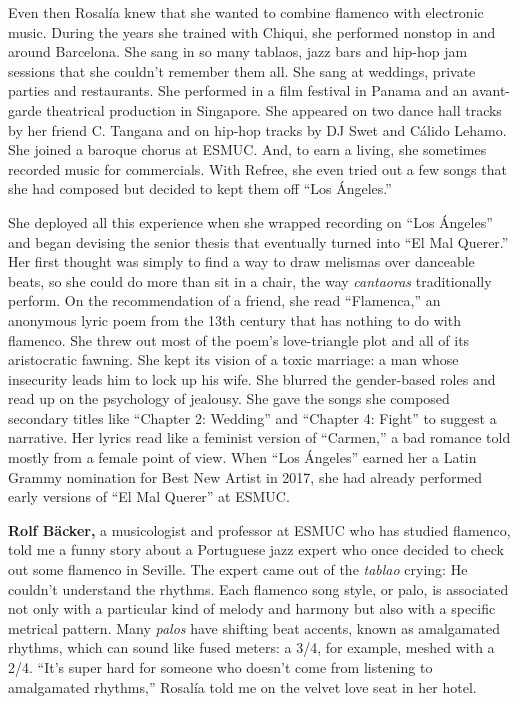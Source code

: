 Even then Rosalía knew that she wanted to combine flamenco with
electronic music. During the years she trained with Chiqui, she
performed nonstop in and around Barcelona. She sang in so many tablaos,
jazz bars and hip-hop jam sessions that she couldn't remember them all.
She sang at weddings, private parties and restaurants. She performed in
a film festival in Panama and an avant-garde theatrical production in
Singapore. She appeared on two dance hall tracks by her friend C.
Tangana and on hip-hop tracks by DJ Swet and Cálido Lehamo. She joined a
baroque chorus at ESMUC. And, to earn a living, she sometimes recorded
music for commercials. With Refree, she even tried out a few songs that
she had composed but decided to kept them off ``Los Ángeles.''

She deployed all this experience when she wrapped recording on ``Los
Ángeles'' and began devising the senior thesis that eventually turned
into ``El Mal Querer.'' Her first thought was simply to find a way to
draw melismas over danceable beats, so she could do more than sit in a
chair, the way \emph{cantaoras} traditionally perform. On the
recommendation of a friend, she read ``Flamenca,'' an anonymous lyric
poem from the 13th century that has nothing to do with flamenco. She
threw out most of the poem's love-triangle plot and all of its
aristocratic fawning. She kept its vision of a toxic marriage: a man
whose insecurity leads him to lock up his wife. She blurred the
gender-based roles and read up on the psychology of jealousy. She gave
the songs she composed secondary titles like ``Chapter 2: Wedding'' and
``Chapter 4: Fight'' to suggest a narrative. Her lyrics read like a
feminist version of ``Carmen,'' a bad romance told mostly from a female
point of view. When ``Los Ángeles'' earned her a Latin Grammy nomination
for Best New Artist in 2017, she had already performed early versions of
``El Mal Querer'' at ESMUC.

\textbf{Rolf Bäcker,} a musicologist and professor at ESMUC who has
studied flamenco, told me a funny story about a Portuguese jazz expert
who once decided to check out some flamenco in Seville. The expert came
out of the \emph{tablao} crying: He couldn't understand the rhythms.
Each flamenco song style, or palo, is associated not only with a
particular kind of melody and harmony but also with a specific metrical
pattern. Many \emph{palos} have shifting beat accents, known as
amalgamated rhythms, which can sound like fused meters: a 3/4, for
example, meshed with a 2/4. ``It's super hard for someone who doesn't
come from listening to amalgamated rhythms,'' Rosalía told me on the
velvet love seat in her hotel.

